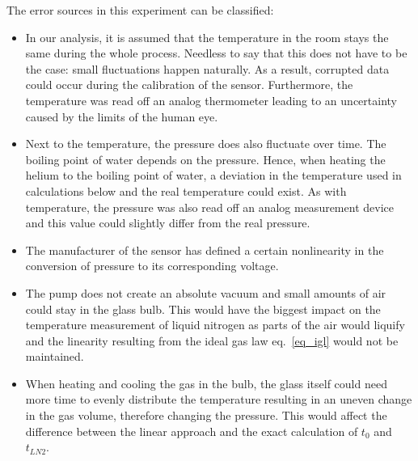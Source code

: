     The error sources in this experiment can be classified:
    \begin{itemize}
        \item In our analysis, it is assumed that the temperature in the room stays the same during the whole process.
        Needless to say that this does not have to be the case: small fluctuations happen naturally.
        As a result, corrupted data could occur during the calibration of the sensor.
        Furthermore, the temperature was read off an analog thermometer leading to an uncertainty caused by the limits of the human eye.
        \item Next to the temperature, the pressure does also fluctuate over time.
        The boiling point of water depends on the pressure.
        Hence, when heating the helium to the boiling point of water, a deviation in the temperature used in calculations below and the real temperature could exist.
        As with temperature, the pressure was also read off an analog measurement device and this value could slightly differ from the real pressure.
        \item The manufacturer of the sensor has defined a certain nonlinearity in the conversion of pressure to its corresponding voltage.
        \item The pump does not create an absolute vacuum and small amounts of air could stay in the glass bulb.
        This would have the biggest impact on the temperature measurement of liquid nitrogen as parts of the air would liquify and the linearity resulting from the ideal gas law eq.~\ref{eq_igl} would not be maintained.
        \item When heating and cooling the gas in the bulb, the glass itself could need more time to evenly distribute the temperature resulting in an uneven change in the gas volume, therefore changing the pressure.
        This would affect the difference between the linear approach and the exact calculation of $t_0$ and $t_{LN2}$.
    \end{itemize}

